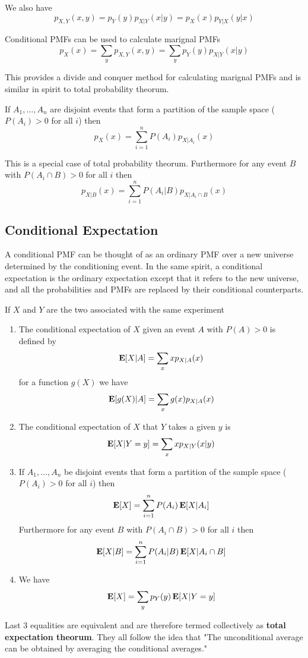  We also have \[p_{X,Y}(x,y)=p_Y(y) p_{X|Y}(x|y) =p_X(x) p_{Y|X}(y|x)\]

 Conditional PMFs can be used to calculate marignal PMFs
 \[p_X(x)=\sum_y p_{X,Y}(x,y)=\sum_y p_Y(y)p_{X|Y}(x|y)\]

 This provides a divide and conquer method for calculating marignal PMFs and is similar in spirit to total probability theorum.

 If $A_1, \ldots, A_n$ are disjoint events that form a partition of the sample space ($P(A_i)>0$ for all $i$) then
 \[p_X(x)=\sum_{i=1}^{n} P(A_i) p_{X|A_i}(x)\]

 This is a special case of total probability theorum. Furthermore for any event $B$ with $P(A_i \cap B)>0$ for all $i$ then
 \[p_{X|B}(x)=\sum_{i=1}^n P(A_i|B)p_{X|A_i \cap B}(x)\]

 \subsection{Conditional Expectation}
 A conditional PMF can be thought of as an ordinary PMF over a new universe determined by the conditioning event. In the same spirit, a conditional expectation is the ordinary expectation except that it refers to the new universe, and all the probabilities and PMFs are replaced by their conditional counterparts.

 If $X$ and $Y$ are the two \rv associated with the same experiment
 \begin{enumerate}
     \item The conditional expectation of $X$ given an event $A$ with $P(A)>0$ is defined by
        \[\operatorname{\textbf{E}}[X|A]=\sum_x xp_{X|A}(x)\]
     for a function $g(X)$ we have
        \[\operatorname{\textbf{E}}[g(X)|A]=\sum_x g(x) p_{X|A}(x)\]
     \item The conditional expectation of $X$ that $Y$ takes a given $y$ is 
        \[\operatorname{\textbf{E}}[X|Y=y]=\sum_x x p_{X|Y}(x|y)\]
     \item If $A_1, \ldots, A_n$ be disjoint events that form a partition of the sample space ($P(A_i)>0$ for all $i$) then
        \[\operatorname{\textbf{E}}[X]=\sum_{i=1}^n P(A_i) \operatorname{\textbf{E}}[X|A_i]\]
    Furthermore for any event $B$ with $P(A_i \cap B)>0$ for all $i$ then
        \[\operatorname{\textbf{E}}[X|B]=\sum_{i=1}^n P(A_i|B)\operatorname{\textbf{E}}[X|A_i \cap B]\]
    \item We have \[\operatorname{\textbf{E}}[X]=\sum_y p_Y(y) \operatorname{\textbf{E}}[X|Y=y]\]
    \end{enumerate}

Last 3 equalities are equivalent and are therefore termed collectively as \textbf{total expectation theorum}. They all follow the idea that "The unconditional average can be obtained by averaging the conditional averages."

